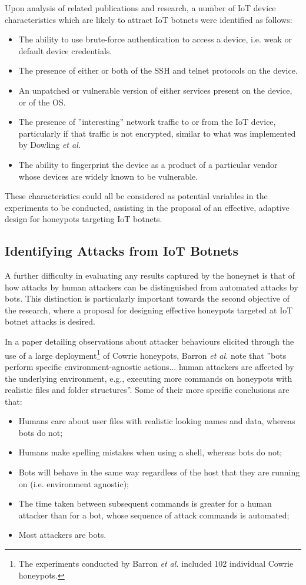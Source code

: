 Upon analysis of related publications and research, a number of IoT device characteristics which are likely to attract IoT botnets were identified as follows:
\begin{itemize}
\item The ability to use brute-force authentication to access a device, i.e. weak or default device credentials.
\item The presence of either or both of the SSH and telnet protocols on the device.
\item An unpatched or vulnerable version of either services present on the device, or of the OS.
\item The presence of ''interesting'' network traffic to or from the IoT device, particularly if that traffic is not encrypted, similar to what was implemented by Dowling \textit{et al.} \cite{Dowling2017}
\item The ability to fingerprint the device as a product of a particular vendor whose devices are widely known to be vulnerable.
\end{itemize}

These characteristics could all be considered as potential variables in the experiments to be conducted, assisting in the proposal of an effective, adaptive design for honeypots targeting IoT botnets.


\subsection{Identifying Attacks from IoT Botnets}
A further difficulty in evaluating any results captured by the honeynet is that of how attacks by human attackers can be distinguished from automated attacks by bots. This distinction is particularly important towards the second objective of the research, where a proposal for designing effective honeypots targeted at IoT botnet attacks is desired.

In a paper detailing observations about attacker behaviours elicited through the use of a large deployment\footnote{The experiments conducted by Barron \textit{et al.} included 102 individual Cowrie honeypots.} of Cowrie honeypots, Barron \textit{et al.} note that ''bots perform specific environment-agnostic actions... human attackers are affected by the underlying environment, e.g., executing more commands on honeypots with realistic files and folder structures''. \cite{PickyAttackers2017} Some of their more specific conclusions are that:

\begin{itemize}
\item Humans care about user files with realistic looking names and data, whereas bots do not;
\item Humans make spelling mistakes when using a shell, whereas bots do not;
\item Bots will behave in the same way regardless of the host that they are running on (i.e. environment agnostic);
\item The time taken between subsequent commands is greater for a human attacker than for a bot, whose sequence of attack commands is automated;
\item Most attackers are bots.
\end{itemize}

